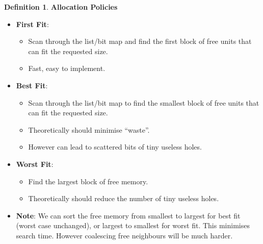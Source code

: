 \documentclass[11pt,a4paper]{article}
\theoremstyle{definition}
\newtheorem{definition}{Definition}[section]
\newenvironment{myitemize}
{ \begin{itemize}
    \setlength{\itemsep}{5pt}
    \setlength{\parskip}{0pt}
    \setlength{\parsep}{0pt}     }
{ \end{itemize}                  }
\begin{document}
\newpage
\begin{definition}{\textbf{Allocation Policies}}
	\begin{myitemize}
		\item \textbf{First Fit}:
		\begin{myitemize}
			\item Scan through the list/bit map and find the first block of free units that can fit the requested size.
			\item Fast, easy to implement.
		\end{myitemize}
		\item \textbf{Best Fit}:
		\begin{myitemize}
			\item Scan through the list/bit map to find the smallest block of free units that can fit the requested size.
			\item Theoretically should minimise ``waste''.
			\item However can lead to scattered bits of tiny useless holes.
		\end{myitemize}
		\item \textbf{Worst Fit}:
		\begin{myitemize}
			\item Find the largest block of free memory.
			\item Theoretically should reduce the number of tiny useless holes.
		\end{myitemize}
		\item \textbf{Note}: We can sort the free memory from smallest to largest for best fit (worst case unchanged), or largest to smallest for worst fit. This minimises search time. However coalescing free neighbours will be much harder.
		

\end{myitemize}
\end{definition}
\end{document}
